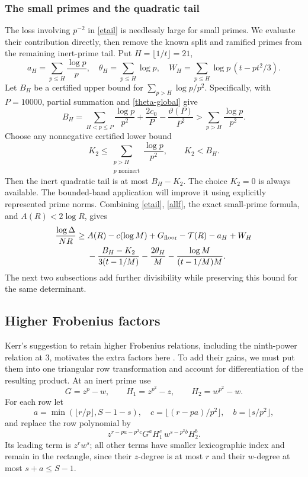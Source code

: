 \documentclass[11pt]{article}
\newcommand{\Tn}{\mathcal T}
\begin{document}
\subsubsection{The small primes and the quadratic tail}
The loss involving \(p^{-2}\) in \eqref{etail} is needlessly large
for small primes. We evaluate their contribution directly, then remove
the known split and ramified primes from the remaining inert-prime tail.
Put \(H=\lfloor1/t\rfloor=21\),
\[
 a_H=\sum_{p\le H}\frac{\log p}p,\quad
 \theta_H=\sum_{p\le H}\log p,\quad
 W_H=\sum_{p\le H}\log p\,(t-pt^2/3).
\]
Let \(B_H\) be a certified upper bound for
\(\sum_{p>H}\log p/p^2\). Specifically, with \(P=10000\),
partial summation and \eqref{theta-global} give
\[
 B_H=\sum_{H<p\le P}\frac{\log p}{p^2}
               +\frac{2c_0}{P}-\frac{\vartheta(P)}{P^2}
 >\sum_{p>H}\frac{\log p}{p^2}.
\]
Choose any nonnegative certified lower bound
\begin{equation}\label{Ktwo}
 K_2\le\sum_{\substack{p>H\\p\text{ noninert}}}\frac{\log p}{p^2},
 \qquad K_2<B_H.
\end{equation}
Then the inert quadratic tail is at most \(B_H-K_2\).
The choice \(K_2=0\) is always available. The bounded-band application
will improve it using explicitly represented prime norms. Combining \eqref{etail}, \eqref{allf}, the
exact small-prime formula, and \(A(R)<2\log R\), gives
\begin{align}\label{basevaluation}
 \frac{\log\Delta}{NR}\ge{}&
 A(R)-c(\log M)+G_{\rm floor}-\Tn(R)-a_H+W_H\\
 &-\frac{B_H-K_2}{3(t-1/M)}
 -\frac{2\theta_H}{M}-\frac{\log M}{(t-1/M)M}.
 \notag
\end{align}
The next two subsections add further divisibility while preserving this
bound for the same determinant.

\subsection{Higher Frobenius factors}\label{frobenius}
Kerr's suggestion to retain higher Frobenius relations, including the
ninth-power relation at 3, motivates the extra factors here
\cite{kerrcomment}. To add their gains, we must put them into one
triangular row transformation and account for differentiation of the
resulting product.
At an inert prime use
\[
 G=z^p-w,\qquad H_1=z^{p^2}-z,\qquad H_2=w^{p^2}-w.
\]
For each row let
\[
 a=\min(\lfloor r/p\rfloor,S-1-s),\quad
 c=\lfloor(r-pa)/p^2\rfloor,\quad b=\lfloor s/p^2\rfloor,
\]
and replace the row polynomial by
\begin{equation}\label{threefactor}
 z^{r-pa-p^2c}G^aH_1^c\,w^{s-p^2b}H_2^b.
\end{equation}
Its leading term is \(z^rw^s\); all other terms have smaller
lexicographic index and remain in the rectangle, since their
\(z\)-degree is at most \(r\) and their \(w\)-degree at most
\(s+a\le S-1\).
\end{document}
